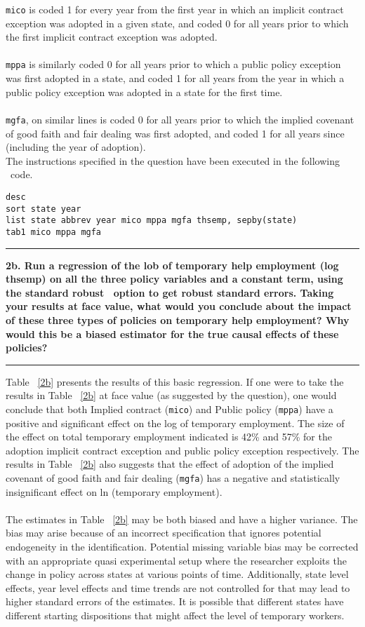 \documentclass[12pt]{article}
\newcommand\question[1]{\vspace{1em}\hrule\vspace{1em}\textbf{#1}\vspace{1em}\hrule\vspace{1em}}
\begin{document}
\noindent \texttt{mico} is coded 1 for every year from the first year in which an implicit contract exception was adopted in a given state, and coded 0 for all years prior to which the first implicit contract exception was adopted. \\\\
\texttt{mppa} is similarly coded 0 for all years prior to which a public policy exception was first adopted in a state, and coded 1 for all years from the year in which a public policy exception was adopted in a state for the first time.\\\\
\texttt{mgfa}, on similar lines is coded 0 for all years prior to which the implied covenant of good faith and fair dealing was first adopted, and coded 1 for all years since (including the year of adoption).\\

The instructions specified in the question have been executed in the following \stata \  code.\\
\begin{lstlisting}
desc
sort state year
list state abbrev year mico mppa mgfa thsemp, sepby(state)
tab1 mico mppa mgfa
\end{lstlisting}

\newpage
\question{2b. Run a regression of the lob of temporary help employment (log thsemp) on all the three policy variables and a constant term, using the standard \textquotesingle robust \textquotesingle \ option to get robust standard errors. Taking your results at face value, what would you conclude about the impact of these three types of policies on temporary help employment? Why would this be a biased estimator for the true causal effects of these policies?}

\noindent Table ~\ref{2b} presents the results of this basic regression. If one were to take the results in Table ~\ref{2b} at face value (as suggested by the question), one would conclude that both Implied contract (\texttt{mico}) and Public policy (\texttt{mppa}) have a positive and significant effect on the log of temporary employment. The size of the effect on total temporary employment indicated is 42\% and 57\% for the adoption implicit contract exception and public policy exception respectively. The results in Table ~\ref{2b} also suggests that the effect of adoption of the implied covenant of good faith and fair dealing (\texttt{mgfa}) has a negative and statistically insignificant effect on ln (temporary employment).\\\\
The estimates in Table ~\ref{2b} may be both biased and have a higher variance. The bias may arise because of an incorrect specification that ignores potential endogeneity in the identification. Potential missing variable bias may be corrected with an appropriate quasi experimental setup where the researcher exploits the change in policy across states at various points of time. Additionally,  state level effects, year level effects and time trends are not controlled for that may lead to higher standard errors of the estimates. It is possible that different states have different starting dispositions that might affect the level of temporary workers. \\
\end{document}
